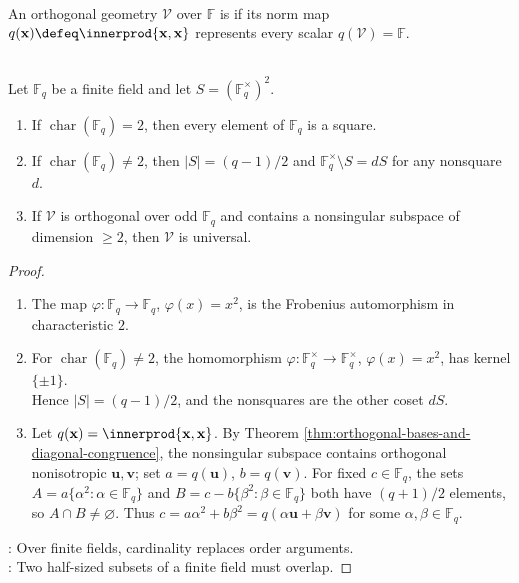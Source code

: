 \begin{definition} \label{def:universal-orthogonal-geometry} \\
An orthogonal geometry $\mathcal{V}$ over $\mathbb{F}$ is  if its norm map $q(\mathbf{x})\defeq\innerprod{\mathbf{x},\mathbf{x}}$ represents every scalar $q(\mathcal{V})=\mathbb{F}$.
\end{definition}

\begin{proposition} \label{prop:finite-field-square-classes-and-universality} \\
Let $\mathbb{F}_q$ be a finite field and let $S=(\mathbb{F}_q^{\times})^2$.
\begin{enumerate}[label=(\roman*)]
\setlength{\itemsep}{0pt}
\item If $\operatorname{char}(\mathbb{F}_q)=2$, then every element of $\mathbb{F}_q$ is a square.
\item If $\operatorname{char}(\mathbb{F}_q)\neq2$, then $|S|=(q-1)/2$ and $\mathbb{F}_q^{\times}\setminus S=dS$ for any nonsquare $d$.
\item If $\mathcal{V}$ is orthogonal over odd $\mathbb{F}_q$ and contains a nonsingular subspace of dimension $\geq2$, then $\mathcal{V}$ is universal.
\end{enumerate}
\begin{proof}
\begin{enumerate}[label=(\roman*)]
\setlength{\itemsep}{0pt}
\item The map $\varphi:\mathbb{F}_q\to\mathbb{F}_q$, $\varphi(x)=x^2$, is the Frobenius automorphism in characteristic $2$.
\item For $\operatorname{char}(\mathbb{F}_q)\neq2$, the homomorphism $\varphi:\mathbb{F}_q^{\times}\to\mathbb{F}_q^{\times}$, $\varphi(x)=x^2$, has kernel $\{\pm1\}$.\\
Hence $|S|=(q-1)/2$, and the nonsquares are the other coset $dS$.
\item Let $q(\mathbf{x})=\innerprod{\mathbf{x},\mathbf{x}}$. By Theorem \ref{thm:orthogonal-bases-and-diagonal-congruence}, the nonsingular subspace contains orthogonal nonisotropic $\mathbf{u},\mathbf{v}$; set $a=q(\mathbf{u})$, $b=q(\mathbf{v})$. For fixed $c\in\mathbb{F}_q$, the sets $A=a\{\alpha^2:\alpha\in\mathbb{F}_q\}$ and $B=c-b\{\beta^2:\beta\in\mathbb{F}_q\}$ both have $(q+1)/2$ elements, so $A\cap B\neq\varnothing$. Thus $c=a\alpha^2+b\beta^2=q(\alpha\mathbf{u}+\beta\mathbf{v})$ for some $\alpha,\beta\in\mathbb{F}_q$.
\end{enumerate}
: Over finite fields, cardinality replaces order arguments.\\
: Two half-sized subsets of a finite field must overlap.
\end{proof}
\end{proposition}

